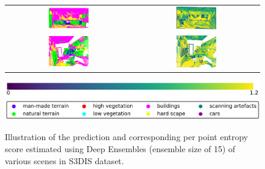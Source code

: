 \begin{figure}[h!]
\begin{tabular}{cc}
            \includegraphics[width=0.33\textwidth, height=0.18\textheight]{images/seg_output/s3dis_DE/S3DIS_3_Pred.pdf}& 
            \includegraphics[width=0.33\textwidth, height=0.18\textheight]{images/seg_output/flipout/ent_de_s3dis_2.pdf}\\

            \includegraphics[width=0.33\textwidth, height=0.18\textheight]{images/seg_output/s3dis_DE/S3DIS_4_Pred.pdf}& 
            \includegraphics[width=0.33\textwidth, height=0.18\textheight]{images/seg_output/flipout/ent_de_s3dis_4.pdf}\\
        \end{tabular}
        \includegraphics[scale=0.45]{images/ent_legend.pdf}
        \includegraphics[scale=0.45]{images/legend.png}
        \caption{Illustration of the prediction and corresponding per point entropy score estimated using Deep Ensembles (ensemble size of 15) of various scenes in S3DIS dataset.}
        \label{fig:de_s3dis_entmap}
    \end{figure}
